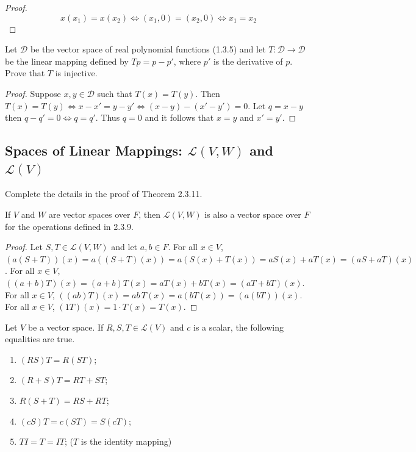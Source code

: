 \begin{proof}
    \[x(x_1) = x(x_2) \iff (x_1, 0) = (x_2, 0) \iff x_1 = x_2\]
\end{proof}

\begin{tcolorbox}[title=Problem 6, breakable]
    Let $\mathcal{D}$ be the vector space of real polynomial functions (1.3.5)
    and let $T : \mathcal{D} \longrightarrow \mathcal{D}$ be the linear mapping 
    defined by $Tp = p - p'$, where $p'$ is the derivative of $p$.
    Prove that $T$ is injective.
\end{tcolorbox}

\begin{proof}
    Suppose $x, y \in \mathcal{D}$ such that $T(x) = T(y)$.
    Then $T(x) = T(y) \iff x - x' = y - y' \iff (x - y) - (x' - y') = 0$.
    Let $q = x - y$ then $q - q' = 0 \iff q = q'$.
    Thus $q = 0$ and it follows that $x = y$ and $x' = y'$.
\end{proof}

\subsection{Spaces of Linear Mappings: $\mathcal{L}(V, W)$ and $\mathcal{L}(V)$}

\begin{tcolorbox}[title=Problem 1, breakable]
    Complete the details in the proof of Theorem 2.3.11.
\end{tcolorbox}

\begin{theorem}
    If $V$ and $W$ are vector spaces over $F$, then 
    $\mathcal{L}(V, W)$ is also a vector space over $F$ 
    for the operations defined in 2.3.9.
\end{theorem}

\begin{proof}
    Let $S,T \in \mathcal{L}(V,W)$ and let $a,b \in F$.
    For all $x \in V$, $(a(S+T))(x)
        = a((S+T)(x))
        = a(S(x)+T(x))
        = aS(x)+aT(x)
        = (aS+aT)(x)$.
    For all $x \in V$, $((a+b)T)(x)
        = (a+b)T(x)
        = aT(x)+bT(x)
        = (aT+bT)(x)$.
    For all $x \in V$, $((ab)T)(x)
        = ab\,T(x)
        = a(bT(x))
        = (a(bT))(x)$.
    For all $x \in V$,
        $(1T)(x)=1\cdot T(x)=T(x)$.
\end{proof}

\begin{tcolorbox}[title=Problem 2, breakable]
    Let $V$ be a vector space. If $R, S, T \in \mathcal{L}(V)$ and $c$
        is a scalar, the following equalities are true.
    \begin{enumerate}
        \item $(RS)T = R(ST)$;
        \item $(R + S)T = RT + ST$;
        \item $R(S + T) = RS + RT$;
        \item $(cS)T = c(ST) = S(cT)$;
        \item $TI = T = IT$; ($T$ is the identity mapping)
    \end{enumerate}
\end{tcolorbox}

